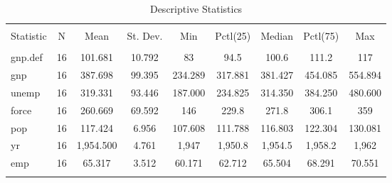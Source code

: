 
\begin{table}[!htbp] \centering 
  \caption{Descriptive Statistics} 
  \label{tab:desc} 
\begin{tabular}{@{\extracolsep{5pt}}lcccccccc} 
\\[-1.8ex]\hline 
\hline \\[-1.8ex] 
Statistic & \multicolumn{1}{c}{N} & \multicolumn{1}{c}{Mean} & \multicolumn{1}{c}{St. Dev.} & \multicolumn{1}{c}{Min} & \multicolumn{1}{c}{Pctl(25)} & \multicolumn{1}{c}{Median} & \multicolumn{1}{c}{Pctl(75)} & \multicolumn{1}{c}{Max} \\ 
\hline \\[-1.8ex] 
gnp.def & 16 & 101.681 & 10.792 & 83 & 94.5 & 100.6 & 111.2 & 117 \\ 
gnp & 16 & 387.698 & 99.395 & 234.289 & 317.881 & 381.427 & 454.085 & 554.894 \\ 
unemp & 16 & 319.331 & 93.446 & 187.000 & 234.825 & 314.350 & 384.250 & 480.600 \\ 
force & 16 & 260.669 & 69.592 & 146 & 229.8 & 271.8 & 306.1 & 359 \\ 
pop & 16 & 117.424 & 6.956 & 107.608 & 111.788 & 116.803 & 122.304 & 130.081 \\ 
yr & 16 & 1,954.500 & 4.761 & 1,947 & 1,950.8 & 1,954.5 & 1,958.2 & 1,962 \\ 
emp & 16 & 65.317 & 3.512 & 60.171 & 62.712 & 65.504 & 68.291 & 70.551 \\ 
\hline \\[-1.8ex] 
\end{tabular} 
\end{table} 
